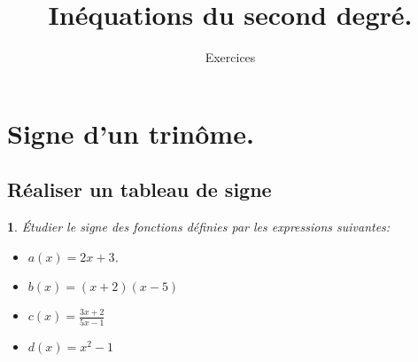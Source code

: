 \documentclass{beamer}
\date{}
\title{Inéquations du second degré.}
\subtitle{Exercices}
\newtheorem{exercise}[theorem]{\translate{Exercise}}
\begin{document}
  
  \begin{frame}
    
    \titlepage
    
  \end{frame}
  
  
    
  \section{Signe d'un trinôme.}
  \subsection{Réaliser un tableau de signe}
  \begin{frame} 
    
  \begin{exercise}
    \'Etudier le signe des fonctions définies par les expressions suivantes:
    \begin{itemize}
     \item $a(x)=2x+3$.
     \item $b(x)=(x+2)(x-5)$
     \item $c(x)=\frac{3x+2}{5x-1}$
     \item $d(x)=x^2-1$
   \end{itemize}    
  \end{exercise}
  
  \end{frame}
  
\end{document}
